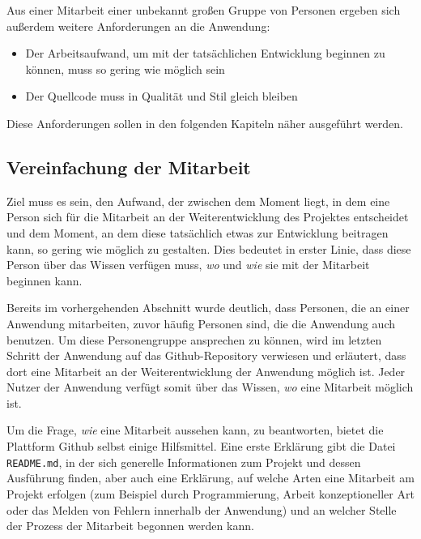 Aus einer Mitarbeit einer unbekannt großen Gruppe von Personen ergeben sich außerdem weitere Anforderungen an die Anwendung:

\begin{itemize}
  \item Der Arbeitsaufwand, um mit der tatsächlichen Entwicklung beginnen zu können, muss so gering wie möglich sein
  \item Der Quellcode muss in Qualität und Stil gleich bleiben
\end{itemize}

Diese Anforderungen sollen in den folgenden Kapiteln näher ausgeführt werden.

\subsection{Vereinfachung der Mitarbeit}
\label{chap:contribution}
Ziel muss es sein, den Aufwand, der zwischen dem Moment liegt, in dem eine Person sich für die Mitarbeit an der Weiterentwicklung des Projektes entscheidet und dem Moment, an dem diese tatsächlich etwas zur Entwicklung beitragen kann, so gering wie möglich zu gestalten.
Dies bedeutet in erster Linie, dass diese Person über das Wissen verfügen muss, \textit{wo} und \textit{wie} sie mit der Mitarbeit beginnen kann.

Bereits im vorhergehenden Abschnitt wurde deutlich, dass Personen, die an einer Anwendung mitarbeiten, zuvor häufig Personen sind, die die Anwendung auch benutzen. Um diese Personengruppe ansprechen zu können, wird im letzten Schritt der Anwendung auf das Github-Repository verwiesen und erläutert, dass dort eine Mitarbeit an der Weiterentwicklung der Anwendung möglich ist. Jeder Nutzer der Anwendung verfügt somit über das Wissen, \textit{wo} eine Mitarbeit möglich ist.

Um die Frage, \textit{wie} eine Mitarbeit aussehen kann, zu beantworten, bietet die Plattform Github selbst einige Hilfsmittel\footnotemark{}.
Eine erste Erklärung gibt die Datei \verb|README.md|, in der sich generelle Informationen zum Projekt und dessen Ausführung finden, aber auch eine Erklärung, auf welche Arten eine Mitarbeit am Projekt erfolgen (zum Beispiel durch Programmierung, Arbeit konzeptioneller Art oder das Melden von Fehlern innerhalb der Anwendung) und an welcher Stelle der Prozess der Mitarbeit begonnen werden kann.



